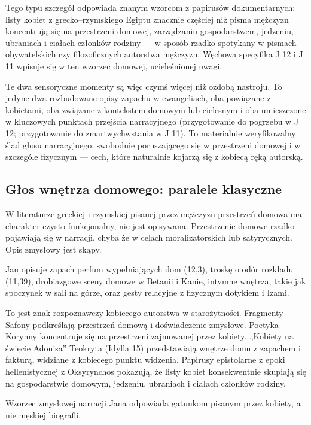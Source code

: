 Tego typu szczegół odpowiada znanym wzorcom z papirusów dokumentarnych:
listy kobiet z grecko–rzymskiego Egiptu znacznie częściej niż pisma mężczyzn koncentrują się na przestrzeni domowej, zarządzaniu gospodarstwem, jedzeniu, ubraniach i ciałach członków rodziny — w sposób rzadko spotykany w pismach obywatelskich czy filozoficznych autorstwa mężczyzn.
Węchowa specyfika J 12 i J 11 wpisuje się w ten wzorzec domowej, ucieleśnionej uwagi.

Te dwa sensoryczne momenty są więc czymś więcej niż ozdobą nastroju.
To jedyne dwa rozbudowane opisy zapachu w ewangeliach, oba powiązane z kobietami, oba związane z kontekstem domowym lub cielesnym i oba umieszczone w kluczowych punktach przejścia narracyjnego (przygotowanie do pogrzebu w J 12; przygotowanie do zmartwychwstania w J 11).
To materialnie weryfikowalny ślad głosu narracyjnego, swobodnie poruszającego się w przestrzeni domowej i w szczególe fizycznym — cech, które naturalnie kojarzą się z kobiecą ręką autorską.

\subsection{Głos wnętrza domowego: paralele klasyczne}

\label{subsec:domestic-interior-voice}

W literaturze greckiej i rzymskiej pisanej przez mężczyzn przestrzeń domowa ma charakter czysto funkcjonalny, nie jest opisywana.
Przestrzenie domowe rzadko pojawiają się w narracji, chyba że w celach moralizatorskich lub satyrycznych.
Opis zmysłowy jest skąpy.

Jan opisuje zapach perfum wypełniających dom (12,3), troskę o odór rozkładu (11,39), drobiazgowe sceny domowe w Betanii i Kanie, intymne wnętrza, takie jak spoczynek w sali na górze, oraz gesty relacyjne z fizycznym dotykiem i łzami.

To jest znak rozpoznawczy kobiecego autorstwa w starożytności.
Fragmenty Safony podkreślają przestrzeń domową i doświadczenie zmysłowe.
Poetyka Korynny koncentruje się na przestrzeni zajmowanej przez kobiety.
„Kobiety na święcie Adonisa” Teokryta (Idylla 15) przedstawiają wnętrze domu z zapachem i fakturą, widziane z kobiecego punktu widzenia.
Papirusy epistolarne z epoki hellenistycznej z Oksyrynchos pokazują, że listy kobiet konsekwentnie skupiają się na gospodarstwie domowym, jedzeniu, ubraniach i ciałach członków rodziny.

Wzorzec zmysłowej narracji Jana odpowiada gatunkom pisanym przez kobiety, a nie męskiej biografii.

